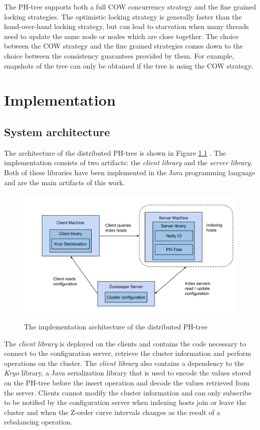 \documentclass[11pt,a4paper]{globis-book}
\begin{document}
The PH-tree supports both a full COW concurrency strategy and the fine grained locking strategies. The optimistic locking strategy is generally faster than the hand-over-hand locking strategy, but can lead to starvation when many threads need to update the same node or nodes which are close together. The choice between the COW strategy and the fine grained strategies comes down to the choice between the consistency guarantees provided by them. For example, snapshots of the tree can only be obtained if the tree is using the COW strategy. 

\chapter{Implementation}
\label{ch:implementation}

\section{System architecture}

The architecture of the distributed PH-tree is shown in Figure \ref{fig:implementation-architecture} . The implementation consists of two artifacts: the \textit{client library} and the \textit{server library}. Both of these libraries have been implemented in the Java programming language and are the main artifacts of this work.

\begin{figure}[h]
    \centering 
    \includegraphics[scale=0.4]{images/implementation-architecture}
    \caption{The implementation architecture of the distributed PH-tree}
    \label{fig:implementation-architecture}
\end{figure}

The \textit{client library} is deployed on the clients and contains the code necessary to connect to the configuration server, retrieve the cluster information and perform operations on the cluster. The \textit{client library} also contains a dependency to the \textit{Kryo} library, a Java serialization library that is used to encode the values stored on the PH-tree before the insert operation and decode the values retrieved from the server. Clients cannot modify the cluster information and can only subscribe to be notified by the configuration server when indexing hosts join or leave the cluster and when the Z-order curve intervals changes as the result of a rebalancing operation.
\end{document}
